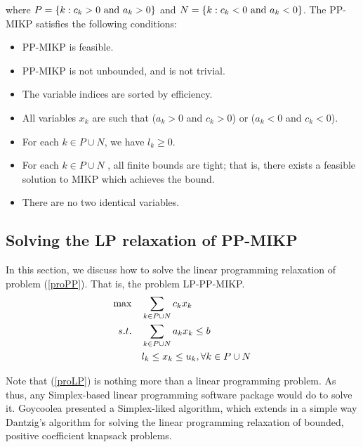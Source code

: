 \documentclass[a4paper,11pt]{article}
\begin{document}
where $P=\{k: c_k>0~\mbox{and}~ a_k>0\}$ and $N=\{k: c_k<0~\mbox{and}~ a_k<0\}$. The PP-MIKP satisfies the following conditions:
\begin{itemize}
\item  PP-MIKP is feasible.
\item  PP-MIKP is not unbounded, and is not trivial.
\item  The variable indices are sorted by efficiency. 
\item  All variables $x_k$ are such that ($a_k >0$ and $c_k >0$) or ($a_k <0$ and $c_k <0$). 
\item For each $k\in P\cup N$, we have $l_k ≥0$.
\item For each $k \in P \cup N$ , all finite bounds are tight; that is, there exists a feasible solution to MIKP which achieves the bound.
\item There are no two identical variables.
\end{itemize}

\subsection{Solving the LP relaxation of PP-MIKP}

In this section, we discuss how to solve the linear programming relaxation of problem (\ref{proPP}).  That is, the problem LP-PP-MIKP.
\begin{align}\label{proLP}
\max \quad & \sum_{k\in P\cup N} c_kx_k\\
s.t.\quad & \sum_{k\in P\cup N} a_kx_k \leq b\notag\\
& l_k\leq x_k \leq u_k, \forall k\in P\cup N\notag
\end{align}

Note that (\ref{proLP}) is nothing more than a linear programming problem. As thus, any Simplex-based linear programming software package would do to solve it. Goycoolea presented a Simplex-liked algorithm, which extends in a simple way Dantzig’s algorithm for solving the linear programming relaxation of bounded, positive coefficient knapsack problems.
\end{document}
